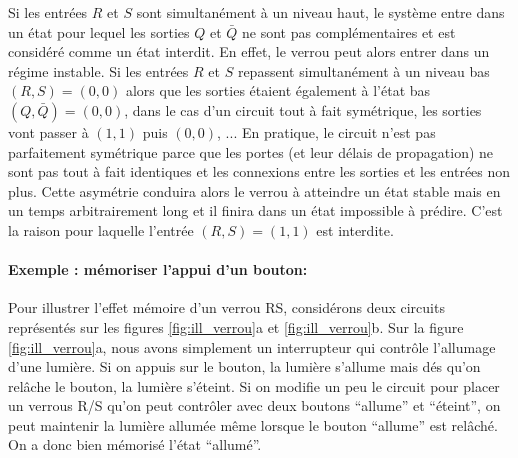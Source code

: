 % 
Si les entrées $R$ et $S$ sont simultanément à un niveau haut, le système entre dans un état pour lequel les sorties $Q$ et $\bar{Q}$ ne sont pas complémentaires et est considéré comme un état interdit. En effet, le verrou peut alors entrer dans un régime instable. Si les entrées $R$ et $S$ repassent simultanément à un niveau bas $(R, S) = (0,0)$ alors que les sorties étaient également à l'état bas $(Q, \bar{Q}) = (0,0)$, dans le cas d'un circuit tout à fait symétrique, les sorties vont passer à $(1,1)$ puis $(0,0)$, ... En pratique, le circuit n'est pas parfaitement symétrique parce que les portes (et leur délais de propagation) ne sont pas tout à fait identiques et les connexions entre les sorties et les entrées non plus. Cette asymétrie conduira alors le verrou à atteindre un état stable mais en un temps arbitrairement long et il finira dans un état impossible à prédire. C'est la raison pour laquelle l'entrée $(R,S) = (1,1)$ est interdite.\\


\paragraph{Exemple : mémoriser l'appui d'un bouton:\\}

Pour illustrer l'effet mémoire d'un verrou RS, considérons deux circuits représentés sur les figures \ref{fig:ill_verrou}a et \ref{fig:ill_verrou}b. Sur la figure \ref{fig:ill_verrou}a, nous avons simplement un interrupteur qui contrôle l'allumage d'une lumière. Si on appuis sur le bouton, la lumière s'allume mais dés qu'on relâche le bouton, la lumière s'éteint. Si on modifie un peu le circuit pour placer un verrous R/S qu'on peut contrôler avec deux boutons ``allume'' et ``éteint'', on peut maintenir la lumière allumée même lorsque le bouton ``allume'' est relâché. On a donc bien mémorisé l'état ``allumé''. 

